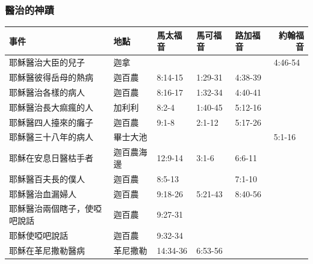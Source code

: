 \subsubsection{醫治的神蹟}
\begin{table}[htbp]
  \centering
    \begin{tabular}{|p{15.145em}|p{5.785em}|l|l|p{6.5em}|r|}
    \toprule
    \textbf{事件} & \textbf{地點} & \multicolumn{1}{p{6.215em}|}{\textbf{馬太福音}} & \multicolumn{1}{p{5.215em}|}{\textbf{馬可福音}} & \textbf{路加福音} & \multicolumn{1}{p{5em}|}{\textbf{約翰福音}} \\
    \midrule
    耶穌醫治大臣的兒子 & 迦拿    &       &       & \multicolumn{1}{r|}{} & \multicolumn{1}{l|}{4:46-54} \\
    \midrule
    耶穌醫彼得岳母的熱病 & 迦百農   & \multicolumn{1}{p{6.215em}|}{8:14-15} & \multicolumn{1}{p{5.215em}|}{1:29-31} & 4:38-39 &  \\
    \midrule
    耶穌醫治各樣的病人 & 迦百農   & \multicolumn{1}{p{6.215em}|}{8:16-17} & \multicolumn{1}{p{5.215em}|}{1:32-34} & 4:40-41 &  \\
    \midrule
    耶穌醫治長大痲瘋的人 & 加利利   & \multicolumn{1}{p{6.215em}|}{8:2-4} & \multicolumn{1}{p{5.215em}|}{1:40-45} & 5:12-16 &  \\
    \midrule
    耶穌醫四人擡來的癱子 & 迦百農   & \multicolumn{1}{p{6.215em}|}{9:1-8} & \multicolumn{1}{p{5.215em}|}{2:1-12} & 5:17-26 &  \\
    \midrule
    耶穌醫三十八年的病人 & 畢士大池  &       &       & \multicolumn{1}{r|}{} & \multicolumn{1}{l|}{5:1-16} \\
    \midrule
    耶穌在安息日醫枯手者 & 迦百農海邊 & \multicolumn{1}{p{6.215em}|}{12:9-14} & \multicolumn{1}{p{5.215em}|}{3:1-6} & 6:6-11 &  \\
    \midrule
    耶穌醫百夫長的僕人 & 迦百農   & \multicolumn{1}{p{6.215em}|}{8:5-13} &       & 7:1-10 &  \\
    \midrule
    耶穌醫治血漏婦人 & 迦百農   & \multicolumn{1}{p{6.215em}|}{9:18-26} & \multicolumn{1}{p{5.215em}|}{5:21-43} & 8:40-56 &  \\
    \midrule
    耶穌醫治兩個瞎子，使啞吧說話 & 迦百農   & \multicolumn{1}{p{6.215em}|}{9:27-31} &       & \multicolumn{1}{r|}{} &  \\
    \midrule
    耶穌使啞吧說話 & 迦百農   & \multicolumn{1}{p{6.215em}|}{9:32-34} &       & \multicolumn{1}{r|}{} &  \\
    \midrule
    耶穌在革尼撒勒醫病 & 革尼撒勒  & \multicolumn{1}{p{6.215em}|}{14:34-36} & \multicolumn{1}{p{5.215em}|}{6:53-56} & \multicolumn{1}{r|}{} &  \\

\end{tabular}
\end{table}
